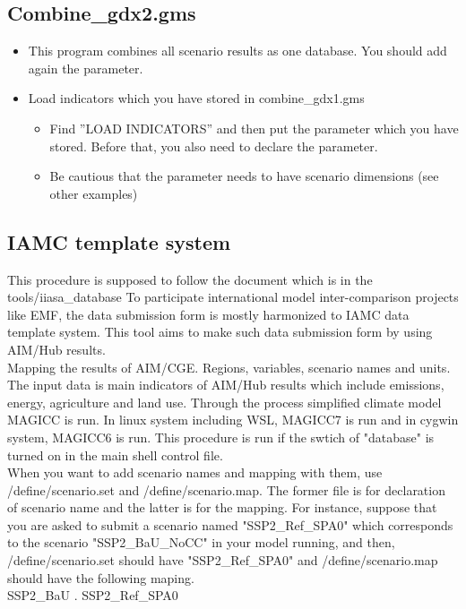 \documentclass[10pt,a4paper,titlepage,dvipdfmx]{book}
\begin{document}
\begin{itemize}
\subsection{\label{subsec:Combine2}Combine\_gdx2.gms}


\begin{itemize}
\item This program combines all scenario results as one database. You should add again the parameter.
\item Load indicators which you have stored in combine\_gdx1.gms
\begin{itemize}
\item Find ''LOAD INDICATORS'' and then put the parameter which you have stored. Before that, you also need to declare the parameter.
\item Be cautious that the parameter needs to have scenario dimensions (see other examples)
\end{itemize}

\end{itemize}
\subsection{\label{subsec:IAMCTemSts}IAMC template system }

  This procedure is supposed to follow the document which is in the tools/iiasa\_database
To participate international model inter-comparison projects like EMF, 
the data submission form is mostly harmonized to IAMC data template system. 
This tool aims to make such data submission form by using AIM/Hub results.
\\
  Mapping the results of AIM/CGE. Regions, variables, scenario names and units. 
The input data is main indicators of AIM/Hub results which include emissions, energy, agriculture and land use. 
Through the process simplified climate model MAGICC is run. In linux system including WSL, MAGICC7 is run and in cygwin system, MAGICC6 is run.
This procedure is run if the swtich of "database" is turned on in the main shell control file.
\\
  When you want to add scenario names and mapping with them, use /define/scenario.set and /define/scenario.map. 
The former file is for declaration of scenario name and the latter is for the mapping. 
For instance, suppose that you are asked to submit a scenario named "SSP2\_Ref\_SPA0" which corresponds to the scenario "SSP2\_BaU\_NoCC" in your model running, and
then, /define/scenario.set should have "SSP2\_Ref\_SPA0" and /define/scenario.map should have the following maping.
\\
SSP2\_BaU . SSP2\_Ref\_SPA0
\\


\end{itemize}
\end{document}
